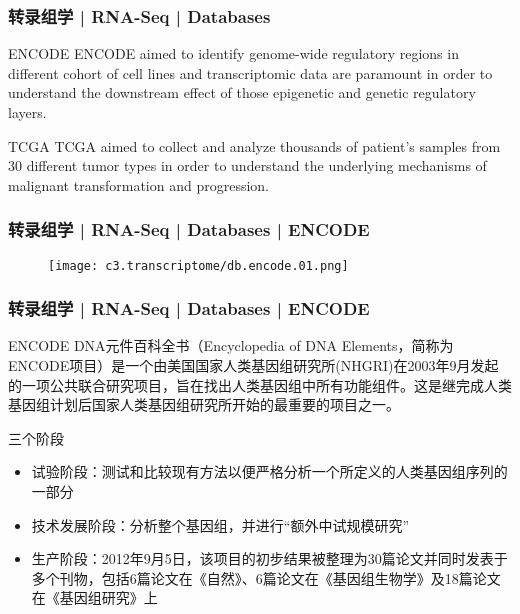 \begin{frame}
  \frametitle{转录组学 | RNA-Seq | Databases}
  \begin{block}{ENCODE}
    ENCODE aimed to identify genome-wide regulatory regions in different cohort of cell lines and transcriptomic data are paramount in order to understand the downstream effect of those epigenetic and genetic regulatory layers.
  \end{block}
  \pause
  \begin{block}{TCGA}
    TCGA aimed to collect and analyze thousands of patient's samples from 30 different tumor types in order to understand the underlying mechanisms of malignant transformation and progression.
  \end{block}
\end{frame}

\begin{frame}
  \frametitle{转录组学 | RNA-Seq | Databases | ENCODE}
  \begin{figure}
    \centering
    \texttt{[image: c3.transcriptome/db.encode.01.png]}
  \end{figure}
\end{frame}

\begin{frame}
  \frametitle{转录组学 | RNA-Seq | Databases | ENCODE}
  \begin{block}{ENCODE}
 DNA元件百科全书（Encyclopedia of DNA Elements，简称为ENCODE项目）是一个由美国国家人类基因组研究所(NHGRI)在2003年9月发起的一项公共联合研究项目，旨在找出人类基因组中所有功能组件。这是继完成人类基因组计划后国家人类基因组研究所开始的最重要的项目之一。
  \end{block}
  \pause
  \begin{block}{三个阶段}
    \begin{itemize}
      \item 试验阶段：测试和比较现有方法以便严格分析一个所定义的人类基因组序列的一部分
      \item 技术发展阶段：分析整个基因组，并进行“额外中试规模研究”
      \item 生产阶段：2012年9月5日，该项目的初步结果被整理为30篇论文并同时发表于多个刊物，包括6篇论文在《自然》、6篇论文在《基因组生物学》及18篇论文在《基因组研究》上
    \end{itemize}
  \end{block}
\end{frame}

